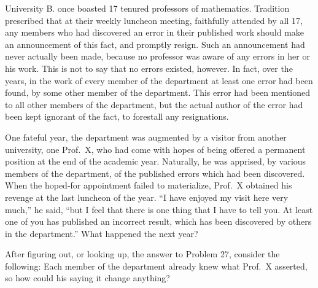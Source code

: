  University B. once boasted 17 tenured professors of mathematics.
Tradition prescribed that at their weekly luncheon meeting, faithfully
attended by all 17, any members who had discovered an error in their
published work should make an announcement of this fact, and promptly resign.
Such an announcement had never actually been made, because no professor was
aware of any errors in her or his work. This is not to say that no errors
existed, however. In fact, over the years, in the work of every member of the
department at least one error had been found, by some other member of the
department. This error had been mentioned to all other members of the
department, but the actual author of the error had been kept ignorant of the
fact, to forestall any resignations.

One fateful year, the department was augmented by a visitor from another
university, one Prof.~X, who had come with hopes of being offered a permanent
position at the end of the academic year. Naturally, he was apprised, by
various members of the department, of the published errors which had been
discovered. When the hoped-for appointment failed to materialize, Prof.~X
obtained his revenge at the last luncheon of the year. ``I have enjoyed my
visit here very much,'' he said, ``but I feel that there is one thing that I
have to tell you. At least one of you has published an incorrect result,
which has been discovered by others in the department.'' What happened the
next year?

 After figuring out, or looking up, the answer to Problem 27,
consider the following: Each member of the department already knew what
Prof.~X asserted, so how could his saying it change anything?
